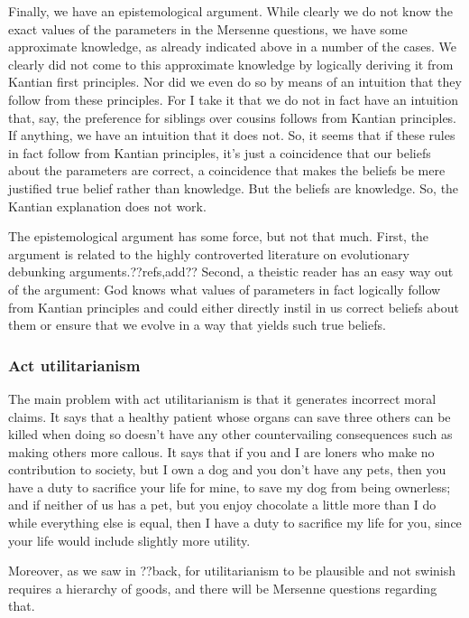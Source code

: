 Finally, we have an epistemological argument. While clearly we do not know the exact values of the parameters in the Mersenne
questions, we have some approximate knowledge, as already indicated above in a number of the cases. We clearly did not come
to this approximate knowledge by logically deriving it from Kantian first principles. Nor did we even do so by means of an
intuition that they follow from these principles. For I take it that we do not in fact have an intuition that, say, the
preference for siblings over cousins follows from Kantian principles. If anything, we have an intuition that it does not.
So, it seems that if these rules in fact follow from Kantian principles, it's just a coincidence that our beliefs about
the parameters are correct, a coincidence that makes the beliefs be mere justified true belief rather than
knowledge. But the beliefs are knowledge. So, the Kantian explanation does not work. 

The epistemological argument has some force, but not that much. First, the argument is related to the highly controverted
literature on evolutionary debunking arguments.??refs,add?? Second, a theistic reader has an easy way out of the argument:
God knows what values of parameters in fact logically follow from Kantian principles and could either directly instil in
us correct beliefs about them or ensure that we evolve in a way that yields such true beliefs.

\subsubsection{Act utilitarianism}
The main problem with act utilitarianism is that it generates incorrect moral claims. It says that a healthy patient
whose organs can save three others can be killed when doing so doesn't have any other countervailing consequences such
as making others more callous. It says that if you and I are loners who make no contribution to society, but I own
a dog and you don't have any pets, then you have a duty to sacrifice your life for mine, to save my dog from being
ownerless; and if neither of us has a pet, but you enjoy chocolate a little more than I do while everything else is
equal, then I have a duty to sacrifice my life for you, since your life would include slightly more utility.

Moreover, as we saw in ??back, for utilitarianism to be plausible and not swinish requires a hierarchy of goods,
and there will be Mersenne questions regarding that.

